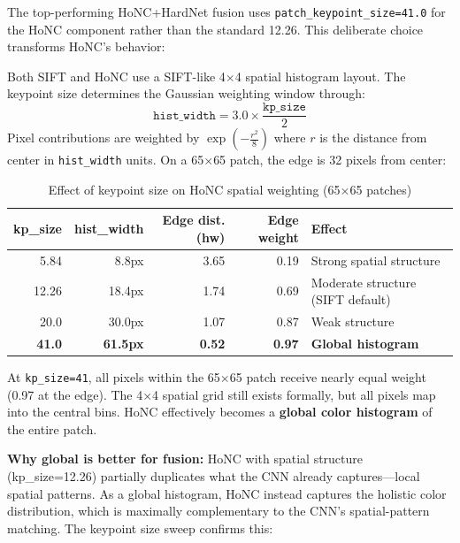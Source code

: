The top-performing HoNC+HardNet fusion uses \texttt{patch\_keypoint\_size=41.0} for the HoNC component rather than the standard 12.26. This deliberate choice transforms HoNC's behavior:

Both SIFT and HoNC use a SIFT-like 4$\times$4 spatial histogram layout. The keypoint size determines the Gaussian weighting window through:
\begin{equation}
    \texttt{hist\_width} = 3.0 \times \frac{\texttt{kp\_size}}{2}
\end{equation}
Pixel contributions are weighted by $\exp\!\left(-\frac{r^2}{8}\right)$ where $r$ is the distance from center in \texttt{hist\_width} units. On a 65$\times$65 patch, the edge is 32 pixels from center:

\begin{table}[ht]
\centering
\caption{Effect of keypoint size on HoNC spatial weighting (65$\times$65 patches)}
\label{tab:honc_kpsize}
\begin{tabular}{rrrrl}
\toprule
\textbf{kp\_size} & \textbf{hist\_width} & \textbf{Edge dist. (hw)} & \textbf{Edge weight} & \textbf{Effect} \\
\midrule
5.84 & 8.8px & 3.65 & 0.19 & Strong spatial structure \\
12.26 & 18.4px & 1.74 & 0.69 & Moderate structure (SIFT default) \\
20.0 & 30.0px & 1.07 & 0.87 & Weak structure \\
\textbf{41.0} & \textbf{61.5px} & \textbf{0.52} & \textbf{0.97} & \textbf{Global histogram} \\
\bottomrule
\end{tabular}
\end{table}

At \texttt{kp\_size=41}, all pixels within the 65$\times$65 patch receive nearly equal weight (0.97 at the edge). The 4$\times$4 spatial grid still exists formally, but all pixels map into the central bins. HoNC effectively becomes a \textbf{global color histogram} of the entire patch.

\textbf{Why global is better for fusion:} HoNC with spatial structure (kp\_size=12.26) partially duplicates what the CNN already captures---local spatial patterns. As a global histogram, HoNC instead captures the holistic color distribution, which is maximally complementary to the CNN's spatial-pattern matching. The keypoint size sweep confirms this:

